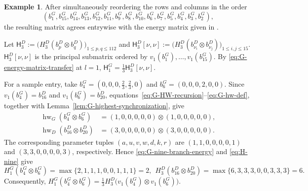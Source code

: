 \documentclass[11pt,reqno]{amsart}
\newcommand{\hw}{\operatorname{hw}}
\numberwithin{table}{section}
\numberwithin{equation}{section}
\theoremstyle{plain}
\theoremstyle{definition}
\newtheorem{example}[theorem]{Example}
\begin{document}
\begin{example}
After simultaneously reordering the rows and columns in the order 
\[
(b_1^G,b_{15}^G,b_{14}^G,b_{13}^G,b_{12}^G,b_{11}^G,
b_9^G,b_8^G,b_{10}^G,b_6^G,b_7^G,b_5^G,b_4^G,b_3^G,b_2^G),
\]
the resulting matrix agrees entrywise with the energy matrix given in
\cite[(3.5)]{FHKS}.
	
	Let $\mathsf H_3^D
	:=
	\bigl(
	H_3^D(b_p^D\otimes b_q^D)
	\bigr)_{1\le p,q\le112}$ and $\mathsf H_3^D[\nu,\nu]
	:=
	\bigl(
	H_3^D(b_{\nu_i}^D\otimes b_{\nu_j}^D)
	\bigr)_{1\le i,j\le15}$.
\(\mathsf H_3^D[\nu,\nu]\) is the principal submatrix ordered by
\(v_1(b_1^G),\ldots,v_1(b_{15}^G)\).
By \eqref{eq:G-energy-matrix-transfer} at \(l=1\),
	\(\mathsf H_1^G=\frac13\mathsf H_3^D[\nu,\nu]\).
	
	For a sample entry, take
	\(b_4^G=(0,0,0,\frac23,\frac23,0)\) and
	\(b_6^G=(0,0,0,2,0,0)\).  Since \(v_1(b_4^G)=b_{16}^D\) and
	\(v_1(b_6^G)=b_{20}^D\), equations~\eqref{eq:G-HW-recursion}--\eqref{eq:G-hw-def},
	together with Lemma~\ref{lem:G-highest-synchronization}, give
	\[
	\begin{aligned}
		\hw_G(b_4^G\otimes b_6^G)
		&=
		(1,0,0,0,0,0)\otimes(1,0,0,0,0,0),\\
		\hw_D(b_{16}^D\otimes b_{20}^D)
		&=
		(3,0,0,0,0,0)\otimes(3,0,0,0,0,0).
	\end{aligned}
	\]
	The corresponding parameter tuples
	\((a,u,v,w,d,k,r)\) are
	\((1,1,0,0,0,0,1)\) and \((3,3,0,0,0,0,3)\), respectively.
	Hence \eqref{eq:G-nine-branch-energy} and \eqref{eq:H-nine} give
	\[
		H_1^G(b_4^G\otimes b_6^G)
		=\max\{2,1,1,1,0,0,1,1,1\}=2,\ \
		H_3^D(b_{16}^D\otimes b_{20}^D)
		=\max\{6,3,3,3,0,0,3,3,3\}=6.
	\]
	Consequently, $H_1^G(b_4^G\otimes b_6^G)
	=
	\frac13
	H_3^D\bigl(
	v_1(b_4^G)\otimes v_1(b_6^G)
	\bigr)$.
\end{example}
\end{document}
